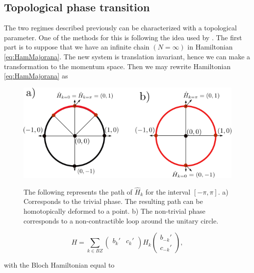 \subsection{Topological phase transition \label{subsec:top}}

The two regimes described previously  can be characterized with a topological parameter.  One of the methods for this is following the idea used by \citeauthor{alicea_new_2012}\cite{alicea_new_2012}. The first part is to suppose that we have an infinite chain $(N=\infty)$ in Hamiltonian \eqref{eq:HamMajorana}. The new system is translation invariant, hence we can make a transformation to the momentum space. Then we may rewrite Hamiltonian \eqref{eq:HamMajorana}  as

\begin{figure}[t]
    \centering
    \includegraphics[scale=0.8]{IMAGES/Majorana/Topological.png}
    \label{fig:topological}
    \caption{ The following represents the path of $\hat{H}_k$ for the interval $[ -\pi, \pi ]$. a) Corresponds to the trivial phase. The resulting path can be homotopically deformed to a point. b) The non-trivial phase corresponds to a non-contractible loop around the unitary circle. \protect {}} 
\end{figure}


\begin{equation}
    H = 
    \sum_{k \in BZ} 
    \begin{pmatrix} 
      b_k'  & c_{k}'\\  
    \end{pmatrix}
    H_k 
    \begin{pmatrix} 
      b_{-k}'     \\ 
      c_{-k}' 
    \end{pmatrix},
    \label{PBCHam2}
\end{equation}

\noindent with the Bloch Hamiltonian equal to 


